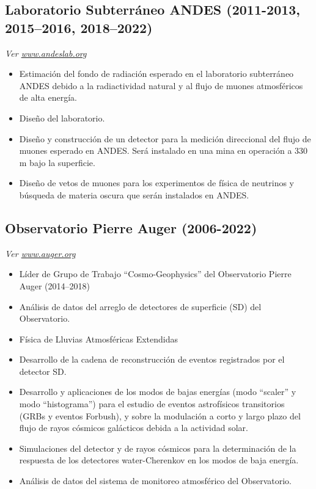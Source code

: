 \subsection*{Laboratorio Subterráneo ANDES (2011-2013, 2015--2016, 2018--2022)}
{\small{\textit{Ver \href{http://www.andeslab.org}{www.andeslab.org}}}}
\begin{itemize}
\item Estimación del fondo de radiación esperado en el laboratorio subterráneo ANDES debido a la radiactividad natural y al flujo de muones atmosféricos de alta energía.
\item Diseño del laboratorio.
\item Diseño y construcción de un detector para la medición direccional del flujo de muones esperado en ANDES. Será instalado en una mina en operación a 330 m bajo la superficie.
\item Diseño de vetos de muones para los experimentos de física de neutrinos y búsqueda de materia oscura que serán instalados en ANDES\@.
\end{itemize}

\subsection*{Observatorio Pierre Auger (2006-2022)}
{\small{\textit{Ver \href{http://www.auger.org/}{www.auger.org}}}}
\begin{itemize}
\item Líder de Grupo de Trabajo ``Cosmo-Geophysics'' del Observatorio Pierre Auger (2014--2018)
\item Análisis de datos del arreglo de detectores de superficie (SD) del Observatorio.
\item Física de Lluvias Atmosféricas Extendidas
\item Desarrollo de la cadena de reconstrucción de eventos registrados por el detector SD\@.
\item Desarrollo y aplicaciones de los modos de bajas energías (modo ``scaler'' y modo ``histograma'') para el estudio de eventos astrofísicos transitorios (GRBs y eventos Forbush), y sobre la modulación a corto y largo plazo del flujo de rayos cósmicos galácticos debida a la actividad solar.
\item Simulaciones del detector y de rayos cósmicos para la determinación de la respuesta de los detectores water-Cherenkov en los modos de baja energía.
\item Análisis de datos del sistema de monitoreo atmosférico del Observatorio.
\end{itemize}
